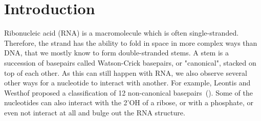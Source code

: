 \documentclass{bioinfo}
\begin{document}
\maketitle

\section{Introduction}
Ribonucleic acid (RNA) is a macromolecule which is often single-stranded. Therefore, the strand has the ability to fold in space in more complex ways than DNA, that we mostly know to form double-stranded stems. A stem is a succession of basepairs called Watson-Crick basepairs, or "canonical", stacked on top of each other. As this can still happen with RNA, we also observe several other ways for a nucleotide to interact with another. For example, Leontis and Westhof proposed a classification of 12 non-canonical basepairs~(\citealp{leontis2001geometric}). Some of the nucleotides can also interact with the 2'OH of a ribose, or with a phosphate, or even not interact at all and bulge out the RNA structure.
   
\end{document}
